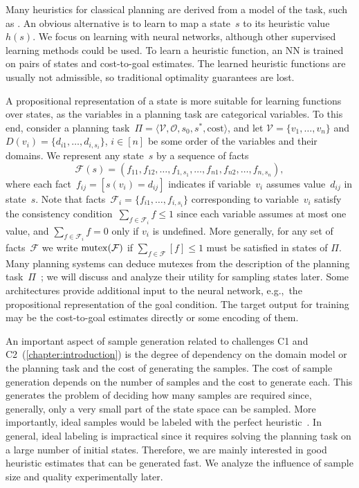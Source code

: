 Many heuristics for classical planning are derived from a model of the task, such as \sas. An obvious alternative is to learn to map a state~$s$ to its heuristic value~$h(s)$. We focus on learning with neural networks, although other supervised learning methods could be used. To learn a heuristic function, an NN is trained on pairs of states and cost-to-goal estimates. The learned heuristic functions are usually not admissible, so traditional optimality guarantees are lost.

A propositional representation of a state is more suitable for learning functions over states, as the variables in a planning task are categorical variables. To this end, consider a \sas planning task~$\Pi=\langle\mathcal{V},\mathcal{O},s_0,s^*, \text{cost}\rangle$, and let $\mathcal{V}=\{v_1,\ldots,v_n\}$ and $D(v_i)=\{d_{i1},\ldots,d_{i,s_i}\}$, $i\in[n]$ be some order of the variables and their domains. We represent any state~$s$ by a sequence of facts $$\mathcal{F}(s)=(f_{11},f_{12},\ldots,f_{1,s_1},\ldots,f_{n1},f_{n2},\ldots,f_{n,s_n}),$$ where each fact~$f_{ij}=[s(v_i)=d_{ij}]$ indicates if variable~$v_i$ assumes value~$d_{ij}$ in state~$s$. Note that facts~$\mathcal{F}_i=\{f_{i1},\ldots,f_{i,s_i}\}$ corresponding to variable~$v_i$ satisfy the consistency condition~$\sum_{f\in \mathcal{F}_i} f\leq 1$ since each variable assumes at most one value, and \mbox{$\sum_{f\in \mathcal{F}_i} f=0$} only if $v_i$ is undefined. More generally, for any set of facts~$\mathcal{F}$ we write $\operatorname{mutex}(\mathcal{F})$ if $\sum_{f\in \mathcal{F}} [f]\leq 1$ must be satisfied in states of $\Pi$. Many planning systems can deduce mutexes from the description of the planning task~$\Pi$~\cite{helmert2009concise}; we will discuss and analyze their utility for sampling states later. Some architectures provide additional input to the neural network, e.g.,~the propositional representation of the goal condition. The target output for training may be the cost-to-goal estimates directly or some encoding of them.

An important aspect of sample generation related to challenges C1 and C2~(\cref{chapter:introduction}) is the degree of dependency on the domain model or the planning task and the cost of generating the samples. The cost of sample generation depends on the number of samples and the cost to generate each. This generates the problem of deciding how many samples are required since, generally, only a very small part of the state space can be sampled. More importantly, ideal samples would be labeled with the perfect heuristic~\hstar. In general, ideal labeling is impractical since it requires solving the planning task on a large number of initial states. Therefore, we are mainly interested in good heuristic estimates that can be generated fast. We analyze the influence of sample size and quality experimentally later.

